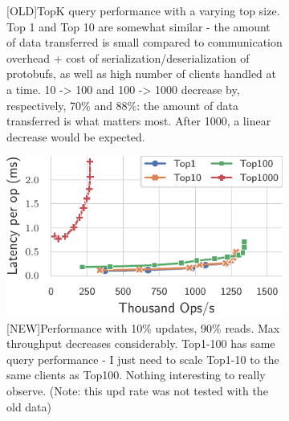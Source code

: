 \documentclass[sigplan,10pt]{acmart}
\begin{document}
\begin{figure}[h]
\begin{subfigure}{.47\linewidth}
		\caption{[OLD]TopK query performance with a varying top size. Top 1 and Top 10 are somewhat similar - the amount of data transferred is small compared to communication overhead + cost of serialization/deserialization of protobufs, as well as high number of clients handled at a time. 10 -> 100 and 100 -> 1000 decrease by, respectively, 70\% and 88\%: the amount of data transferred is what matters most. After 1000, a linear decrease would be expected.}
		\label{fig:(old)bench_top_size_0upd}
	\end{subfigure}
	\caption{}
\end{figure}

\begin{figure}[h]
\centering
\begin{subfigure}{.47\linewidth}
	\includegraphics[width=1\linewidth]{singleQuery/bench_top_size_0_1}
	\caption{[NEW]Performance with 10\% updates, 90\% reads. Max throughput decreases considerably. Top1-100 has same query performance - I just need to scale Top1-10 to the same clients as Top100. Nothing interesting to really observe. (Note: this upd rate was not tested with the old data)}
	\label{fig:(new)bench_top_size_0_1upd}
\end{subfigure}%
\caption{}
\end{figure}
\end{document}

